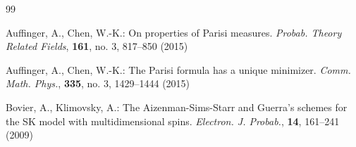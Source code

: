 \documentclass[12pt]{article}
\newenvironment{Proof of lemma}{\noindent{\bf Proof of Lemma}}{\hfill$\Box$\newline}
\newenvironment{Proof of theorem}{\noindent{\bf Proof of Theorem}}{\hfill{\footnotesize${\square}$}\newline}
\newenvironment{Proof of theorems}{\noindent{\bf Proof of Theorems}}{\hfill$\Box$\newline}
\newenvironment{Proof of proposition}{\noindent{\bf Proof of Proposition}}{\hfill$\Box$\newline}
\newenvironment{Proof of propositions}{\noindent{\bf Proof of Propositions}}{\hfill$\Box$\newline}
\newenvironment{Proof of exercise}{\noindent{\it Proof of Exercise:}}{\hfill$\Box$}
\begin{document}
    	\begin{thebibliography}{99}
  		
  		\small
  		
  		
  		
%  		
%  		
%  		
%  		
  		Auffinger, A., Chen, W.-K.: On properties of Parisi measures. {\it Probab. Theory Related Fields}, {\bf 161}, no. 3, 817--850 (2015)
  		
  		Auffinger, A., Chen, W.-K.: The Parisi formula has a unique minimizer. {\it Comm. Math. Phys.}, {\bf 335}, no. 3, 1429--1444 (2015)
  		
%  		
%  		
%  		
  		
  		
  		
%  		
%  		
  		
  		Bovier, A., Klimovsky, A.: The Aizenman-Sims-Starr and Guerra's schemes for the SK model with multidimensional spins. {\it Electron. J. Probab.}, {\bf 14}, 161--241 (2009)
  		

\end{thebibliography}
\end{document}

